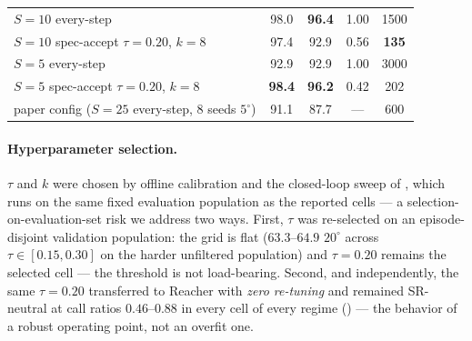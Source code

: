 \documentclass{article}
\newcommand{\ours}[1]{\textbf{#1}}          %
\newcommand{\degc}[1]{$#1^\circ$}
\begin{document}
\begin{table}[h]
\begin{tabular}{lcccc}
$S{=}10$ every-step                                 & 98.0 & \ours{96.4} & 1.00 & 1500 \\
$S{=}10$ spec-accept $\tau{=}0.20$, $k{=}8$         & 97.4 & 92.9 & 0.56 & \ours{135} \\
$S{=}5$ every-step                                  & 92.9 & 92.9 & 1.00 & 3000 \\
$S{=}5$ spec-accept $\tau{=}0.20$, $k{=}8$          & \ours{98.4} & \ours{96.2} & 0.42 & 202 \\
\midrule
paper config ($S{=}25$ every-step, 8 seeds \degc{5})& 91.1 & 87.7 & --- & 600 \\
\bottomrule
\end{tabular}
\end{table}

\paragraph{Hyperparameter selection.} $\tau$ and $k$ were chosen by offline calibration
and the closed-loop sweep of , which runs on the same fixed evaluation
population as the reported cells --- a selection-on-evaluation-set risk we address two
ways. First, $\tau$ was re-selected on an episode-disjoint validation population: the
grid is flat ($63.3$--$64.9$ \degc{20} across $\tau\in[0.15,0.30]$ on the harder
unfiltered population) and $\tau{=}0.20$ remains the selected cell --- the threshold is
not load-bearing. Second, and independently, the same $\tau{=}0.20$ transferred to
Reacher with \emph{zero re-tuning} and remained SR-neutral at call ratios
$0.46$--$0.88$ in every cell of every regime () --- the behavior of a
robust operating point, not an overfit one.
\end{document}
